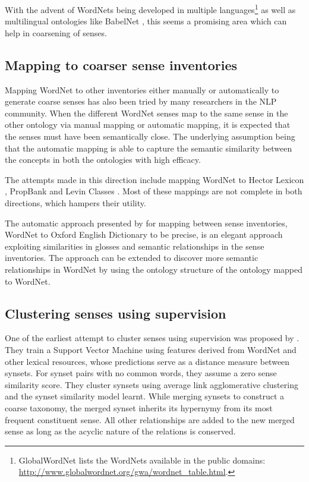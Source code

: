 With the advent of WordNets being developed in multiple languages\footnote{GlobalWordNet lists the WordNets available in the public domains: \url{http://www.globalwordnet.org/gwa/wordnet_table.html}.} as well as multilingual ontologies like BabelNet \citep{NavigliPonzetto:12aij}, this seems a promising area which can help in coarsening of senses.


\subsection{Mapping to coarser sense inventories}
Mapping WordNet to other inventories either manually or automatically to generate coarse senses has also been tried by many researchers in the NLP community. When the different WordNet senses map to the same sense in the other ontology via manual mapping or automatic mapping, it is expected that the senses must have been semantically close. The underlying assumption being that the automatic mapping is able to capture the semantic similarity between the concepts in both the ontologies with high efficacy.

The attempts made in this direction include mapping WordNet to Hector Lexicon \citep{palmer2007making}, PropBank \citep{palmer2004different} and Levin Classes \citep{levin1993english} \citep{palmer2007making}. Most of these mappings are not complete in both directions, which hampers their utility.

The automatic approach presented by \citep{Navigli06meaningfulclustering} for mapping between sense inventories, WordNet to Oxford English Dictionary to be precise, is an elegant approach exploiting similarities in glosses and semantic relationships in the sense inventories. The approach can be extended to discover more semantic relationships in WordNet by using the ontology structure of the ontology mapped to WordNet.

\subsection{Clustering senses using supervision}
One of the earliest attempt to cluster senses using supervision was proposed by \citep{snow07mergesense}. They train a Support Vector Machine \citep{vapnikSVM:95} using features derived from WordNet and other lexical resources, whose predictions serve as a distance measure between synsets. For synset pairs with no common words, they assume a zero sense similarity score. They cluster synsets using average link agglomerative clustering and the synset similarity model learnt. While merging synsets to construct a coarse taxonomy, the merged synset inherits its hypernymy from its most frequent constituent sense. All other relationships are added to the new merged sense as long as the acyclic nature of the relations is conserved.

